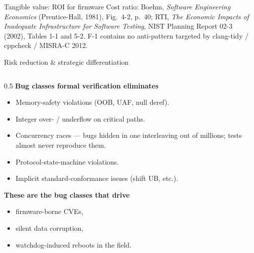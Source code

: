 \documentclass[aspectratio=169,11pt]{beamer}
\begin{document}
\begin{frame}{Tangible value: ROI for firmware}
  \vspace{0.3em}
  {\tiny\textcolor{nvgray}{Cost ratio: Boehm, \emph{Software Engineering
  Economics} (Prentice-Hall, 1981), Fig.\ 4-2, p.\ 40; RTI, \emph{The
  Economic Impacts of Inadequate Infrastructure for Software Testing},
  NIST Planning Report 02-3 (2002), Tables 1-1 and 5-2. F-1 contains
  no anti-pattern targeted by clang-tidy / cppcheck / MISRA-C 2012.}}
\end{frame}

\begin{frame}{Risk reduction \& strategic differentiation}
  \begin{columns}[T,onlytextwidth]
    \begin{column}{0.5\textwidth}
      \footnotesize
      \textbf{Bug classes formal verification eliminates}
      \begin{itemize}\setlength\itemsep{0.1em}
        \item Memory-safety violations (OOB, UAF, null deref).
        \item Integer over- / underflow on critical paths.
        \item Concurrency races --- bugs hidden in one interleaving
              out of millions; tests almost never reproduce them.
        \item Protocol-state-machine violations.
        \item Implicit standard-conformance issues (shift UB, etc.).
      \end{itemize}

      \vspace{0.3em}
      \textbf{These are the bug classes that drive}
      \begin{itemize}\setlength\itemsep{0.1em}
        \item firmware-borne CVEs,
        \item silent data corruption,
        \item watchdog-induced reboots in the field.
      \end{itemize}
    \end{column}


\end{columns}
\end{frame}
\end{document}
